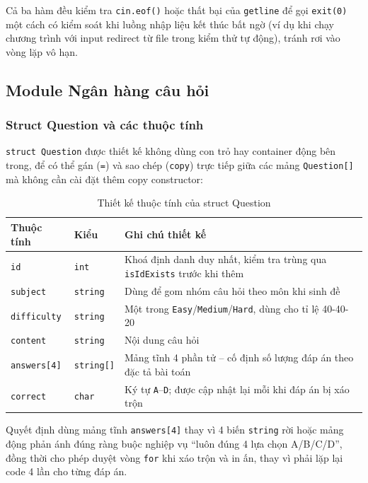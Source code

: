 \documentclass[11pt]{report}
\begin{document}
Cả ba hàm đều kiểm tra \texttt{cin.eof()} hoặc thất bại của \texttt{getline} để gọi \texttt{exit(0)} một cách có kiểm soát khi luồng nhập liệu kết thúc bất ngờ (ví dụ khi chạy chương trình với input redirect từ file trong kiểm thử tự động), tránh rơi vào vòng lặp vô hạn.

\subsection{Module Ngân hàng câu hỏi}

\subsubsection{Struct Question và các thuộc tính}

\texttt{struct Question} được thiết kế không dùng con trỏ hay container động bên trong, để có thể gán (\texttt{=}) và sao chép (\texttt{copy}) trực tiếp giữa các mảng \texttt{Question[]} mà không cần cài đặt thêm copy constructor:

\begin{table}[H]
    \centering
    \begin{tabularx}{\textwidth}{|l|l|X|} \hline
        \textbf{Thuộc tính} & \textbf{Kiểu} & \textbf{Ghi chú thiết kế} \\ \hline
        \texttt{id} & \texttt{int} & Khoá định danh duy nhất, kiểm tra trùng qua \texttt{isIdExists} trước khi thêm \\ \hline
        \texttt{subject} & \texttt{string} & Dùng để gom nhóm câu hỏi theo môn khi sinh đề \\ \hline
        \texttt{difficulty} & \texttt{string} & Một trong \texttt{Easy}/\texttt{Medium}/\texttt{Hard}, dùng cho tỉ lệ 40-40-20 \\ \hline
        \texttt{content} & \texttt{string} & Nội dung câu hỏi \\ \hline
        \texttt{answers[4]} & \texttt{string[]} & Mảng tĩnh 4 phần tử -- cố định số lượng đáp án theo đặc tả bài toán \\ \hline
        \texttt{correct} & \texttt{char} & Ký tự \texttt{A}--\texttt{D}; được cập nhật lại mỗi khi đáp án bị xáo trộn \\ \hline
    \end{tabularx}
    \caption{Thiết kế thuộc tính của struct Question}
    \label{tab:question_struct_design}
\end{table}

Quyết định dùng mảng tĩnh \texttt{answers[4]} thay vì 4 biến \texttt{string} rời hoặc mảng động phản ánh đúng ràng buộc nghiệp vụ ``luôn đúng 4 lựa chọn A/B/C/D'', đồng thời cho phép duyệt vòng \texttt{for} khi xáo trộn và in ấn, thay vì phải lặp lại code 4 lần cho từng đáp án.
\end{document}

